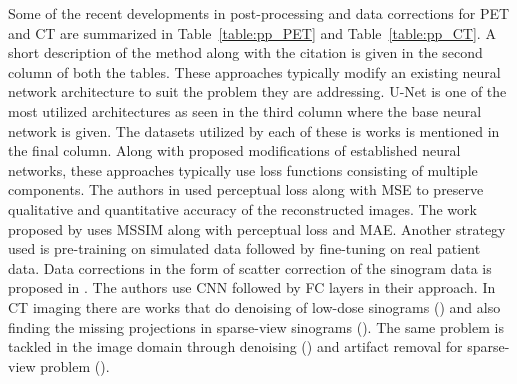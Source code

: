 Some of the recent developments in post-processing and data corrections for \ac{PET} and \ac{CT} are summarized in Table~\ref{table:pp_PET} and Table~\ref{table:pp_CT}. A short description of the method along with the citation is given in the second column of both the tables. These approaches typically modify an existing neural network architecture to suit the problem they are addressing. U-Net is one of the most utilized architectures as seen in the third column where the base neural network is given. The datasets utilized by each of these is works is mentioned in the final column. Along with proposed modifications of established neural networks, these approaches typically use loss functions consisting of multiple components. The authors in \cite{gong2018pet} used perceptual loss along with \ac{MSE} to preserve qualitative and quantitative accuracy of the reconstructed images. The work proposed by \cite{whiteley2020fastpet} uses \ac{MSSIM} along with perceptual loss and \ac{MAE}. Another strategy used is pre-training on simulated data followed by fine-tuning on real patient data. Data corrections in the form of scatter correction of the sinogram data is proposed in \cite{qian2017deep}. The authors use \ac{CNN} followed by \ac{FC} layers in their approach. In \ac{CT} imaging there are works that do denoising of low-dose sinograms (\cite{ma2021sinogram,zhu2020low}) and also finding the missing projections in sparse-view sinograms (\cite{lee2018deep}). The same problem is tackled in the image domain through denoising (\cite{yang2018low}) and artifact removal for sparse-view problem (\cite{jin2017deep,xie2018artifact,zhang2018sparse}).
